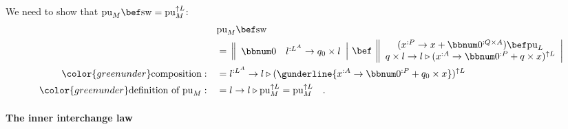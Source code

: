 We need to show that $\text{pu}_{M}\bef\text{sw}=\text{pu}_{M}^{\uparrow L}$:
\begin{align*}
 & \text{pu}_{M}\bef\text{sw}\\
 & =\,\left\Vert \begin{array}{cc}
\bbnum 0 & l^{:L^{A}}\rightarrow q_{0}\times l\end{array}\right|\,\bef\,\left\Vert \begin{array}{c}
(x^{:P}\rightarrow x+\bbnum 0^{:Q\times A})\bef\text{pu}_{L}\\
q\times l\rightarrow l\triangleright(x^{:A}\rightarrow\bbnum 0^{:P}+q\times x)^{\uparrow L}
\end{array}\right|\\
{\color{greenunder}\text{composition}:}\quad & =l^{:L^{A}}\rightarrow l\triangleright(\gunderline{x^{:A}\rightarrow\bbnum 0^{:P}+q_{0}\times x})^{\uparrow L}\\
{\color{greenunder}\text{definition of }\text{pu}_{M}:}\quad & =l\rightarrow l\triangleright\text{pu}_{M}^{\uparrow L}=\text{pu}_{M}^{\uparrow L}\quad.
\end{align*}


\paragraph{The inner interchange law}

